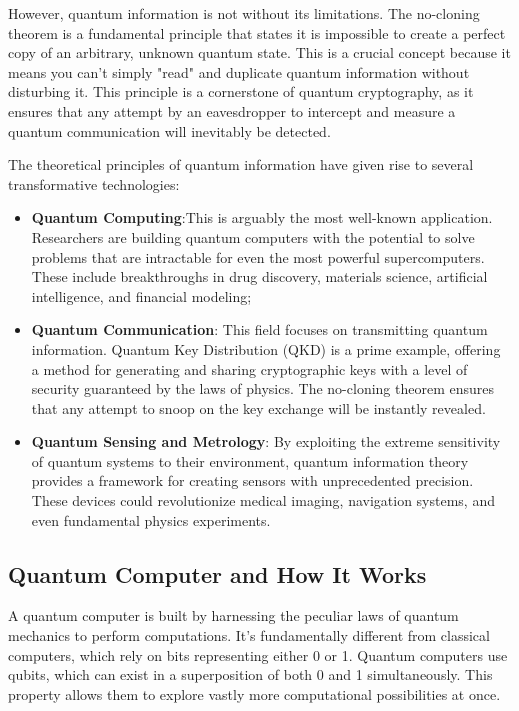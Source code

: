 \documentclass{article}
\begin{document}
However, quantum information is not without its limitations. The no-cloning theorem is a fundamental principle that states it is impossible to create a perfect copy of an arbitrary, unknown quantum state. This is a crucial concept because it means you can't simply "read" and duplicate quantum information without disturbing it. This principle is a cornerstone of quantum cryptography, as it ensures that any attempt by an eavesdropper to intercept and measure a quantum communication will inevitably be detected.

The theoretical principles of quantum information have given rise to several transformative technologies:
\begin{itemize}
 \item \textbf{Quantum Computing}:This is arguably the most well-known application. Researchers are building quantum computers with the potential to solve problems that are intractable for even the most powerful supercomputers. These include breakthroughs in drug discovery, materials science, artificial intelligence, and financial modeling;
 
 \item \textbf{Quantum Communication}: This field focuses on transmitting quantum information. Quantum Key Distribution (QKD) is a prime example, offering a method for generating and sharing cryptographic keys with a level of security guaranteed by the laws of physics. The no-cloning theorem ensures that any attempt to snoop on the key exchange will be instantly revealed.
  
 \item \textbf{Quantum Sensing and Metrology}: By exploiting the extreme sensitivity of quantum systems to their environment, quantum information theory provides a framework for creating sensors with unprecedented precision. These devices could revolutionize medical imaging, navigation systems, and even fundamental physics experiments.
\end{itemize}
\subsection{Quantum Computer and How It Works}
A quantum computer is built by harnessing the peculiar laws of quantum mechanics to perform computations. It's fundamentally different from classical computers, which rely on bits representing either 0 or 1. Quantum computers use qubits, which can exist in a superposition of both 0 and 1 simultaneously. This property allows them to explore vastly more computational possibilities at once.
\end{document}
